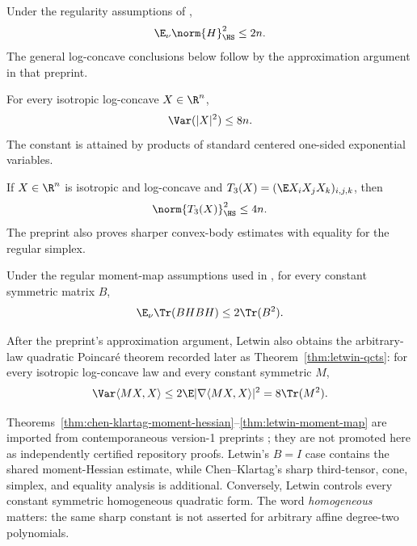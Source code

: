 \documentclass[../../main.tex]{subfiles}
\begin{document}
\begin{theorem}
\label{thm:chen-klartag-moment-hessian}
Under the regularity assumptions of \cite{ChenKlartag2026SharpThinShell},
\[
  \E_\nu\norm{H}_{\HS}^2\le2n.
\]
The general log-concave conclusions below follow by the approximation argument in that preprint.
\end{theorem}

\begin{theorem}
\label{thm:chen-klartag-thin-shell}
For every isotropic log-concave $X\in\R^n$,
\[
  \Var(|X|^2)\le8n.
\]
The constant is attained by products of standard centered one-sided exponential variables.
\end{theorem}

\begin{theorem}
\label{thm:chen-klartag-third-moment}
If $X\in\R^n$ is isotropic and log-concave and
$T_3(X)=(\E X_iX_jX_k)_{i,j,k}$, then
\[
  \norm{T_3(X)}_{\HS}^2\le4n.
\]
The preprint also proves sharper convex-body estimates with equality for the regular simplex.
\end{theorem}

\begin{theorem}
\label{thm:letwin-moment-map}
Under the regular moment-map assumptions used in \cite{Letwin2026QuadraticKLS}, for every
constant symmetric matrix $B$,
\[
  \E_\nu\Tr(BHBH)\le2\Tr(B^2).
\]
\end{theorem}

After the preprint's approximation argument, Letwin also obtains the arbitrary-law quadratic
Poincar\'e theorem recorded later as Theorem~\ref{thm:letwin-qcts}: for every isotropic
log-concave law and every constant symmetric $M$,
\[
  \Var\langle MX,X\rangle
  \le2\E|\nabla\langle MX,X\rangle|^2
  =8\Tr(M^2).
\]

Theorems~\ref{thm:chen-klartag-moment-hessian}--\ref{thm:letwin-moment-map} are imported from
contemporaneous version-1 preprints \cite{ChenKlartag2026SharpThinShell,Letwin2026QuadraticKLS};
they are not promoted here as independently certified repository proofs. Letwin's $B=I$ case
contains the shared moment-Hessian estimate, while Chen--Klartag's sharp third-tensor, cone,
simplex, and equality analysis is additional. Conversely, Letwin controls every constant
symmetric homogeneous quadratic form. The word \emph{homogeneous} matters: the same sharp
constant is not asserted for arbitrary affine degree-two polynomials.
\end{document}
